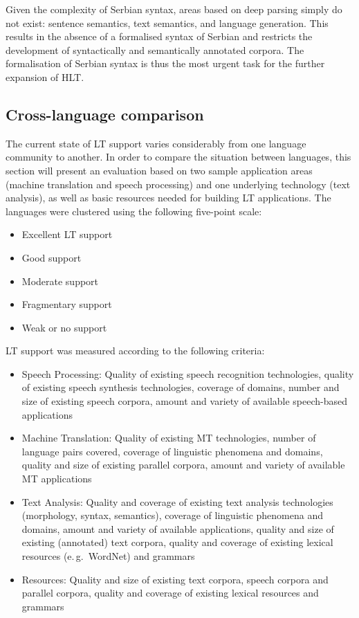 \begin{multicols}{2}
\begin{itemize}
\end{itemize}
Given the complexity of Serbian syntax, areas based on deep parsing simply do not exist: sentence semantics, text semantics, and language generation. This results in the absence of a formalised syntax of Serbian and restricts the development of syntactically and semantically annotated corpora. The formalisation of Serbian syntax is thus the most urgent task for the further expansion of HLT. 
 


 \subsection {Cross-language comparison}
   
The current state of LT support varies considerably from one language community to another. In order to compare the situation between languages, this section will present an evaluation based on two sample application areas (machine translation and speech processing) and one underlying technology (text analysis), as well as basic resources needed for building LT applications. 
The languages were clustered using the following five-point scale: 

    \begin{itemize}
      \item Excellent LT support
      \item Good support
      \item Moderate support
      \item Fragmentary support 
      \item Weak or no support
    \end{itemize}

LT support was measured according to the following criteria:
\begin{itemize}
\item Speech Processing: Quality of existing speech recognition technologies, quality of existing speech synthesis technologies, coverage of domains, number and size of existing speech corpora, amount and variety of available speech-based applications
\item Machine Translation: Quality of existing MT technologies, number of language pairs covered, coverage of linguistic phenomena and domains, quality and size of existing parallel corpora, amount and variety of available MT applications
\item Text Analysis: Quality and coverage of existing text analysis technologies (morphology, syntax, semantics), coverage of linguistic phenomena and domains, amount and variety of available applications, quality and size of existing (annotated) text corpora, quality and coverage of existing lexical resources (e.\,g.~WordNet) and grammars
\item Resources: Quality and size of existing text corpora, speech corpora and parallel corpora, quality and coverage of existing lexical resources and grammars
\end{itemize} 





\end{multicols}
